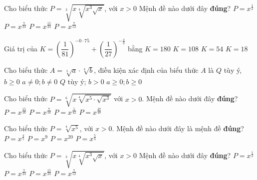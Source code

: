 \begin{ex}%
	Cho biểu thức $P=\sqrt[3]{x\sqrt[4]{x^3\sqrt{x}}}$, với $x>0$ Mệnh đề nào dưới đây \textbf{đúng}?
	\choice
	{$P=x^{\tfrac{1}{2}}$}
	{$P=x^{\tfrac{7}{24}}$}
	{\True $P=x^{\tfrac{15}{24}}$}
	{$P=x^{\tfrac{7}{12}}$}
\end{ex}
\begin{ex}%
	Giá trị của $K=\left(\dfrac{1}{81}\right)^{-0\cdot 75}+\left(\dfrac{1}{27}\right)^{-\tfrac{4}{3}}$ bằng 
	\choice
	{$K=180$}
	{\True $K=108$}
	{$K=54$}
	{$K=18$}
\end{ex}
\begin{ex}%
	Cho biểu thức $A=\sqrt[5]{a}\cdot\sqrt[4]{b}$, điều kiện xác định của biểu thức $A$ là 
	\choice
	{\True $Q$ tùy ý, $b\geq 0$}
	{$a\neq 0;b\neq 0$}
	{$Q$ tùy ý; $b>0$}
	{$a\geq 0;b\geq 0$}
\end{ex}
\begin{ex}%
	Cho biểu thức $P=\sqrt[6]{x\sqrt[4]{x^5\cdot\sqrt{x^3}}}$ với $x>0$. Mệnh đề nào dưới đây \textbf{đúng}?
	\choice
	{$P=x^{\tfrac{15}{16}}$}
	{\True $P=x^{\tfrac{7}{16}}$}
	{$P=x^{\tfrac{5}{42}}$}
	{$P=x^{\tfrac{47}{48}}$}
\end{ex}
\begin{ex}%
	Cho biểu thức $P=\sqrt[4]{x^5}$, với $x>0$. Mệnh đề nào dưới đây là mệnh đề \textbf{đúng}?
	\choice
	{$P=x^{\tfrac{4}{5}}$}
	{$P=x^9$}
	{$P=x^{20}$}
	{\True $P=x^{\tfrac{5}{4}}$}
\end{ex}
\begin{ex}%
	Cho biểu thức $P=\sqrt[3]{x\sqrt[4]{x^3\sqrt{x}}}$, với $x>0$ Mệnh đề nào dưới đây \textbf{đúng}?
	\choice
	{$P=x^{\tfrac{1}{2}}$}
	{$P=x^{\tfrac{7}{24}}$}
	{\True $P=x^{\tfrac{15}{24}}$}
	{$P=x^{\tfrac{7}{12}}$}
\end{ex}
